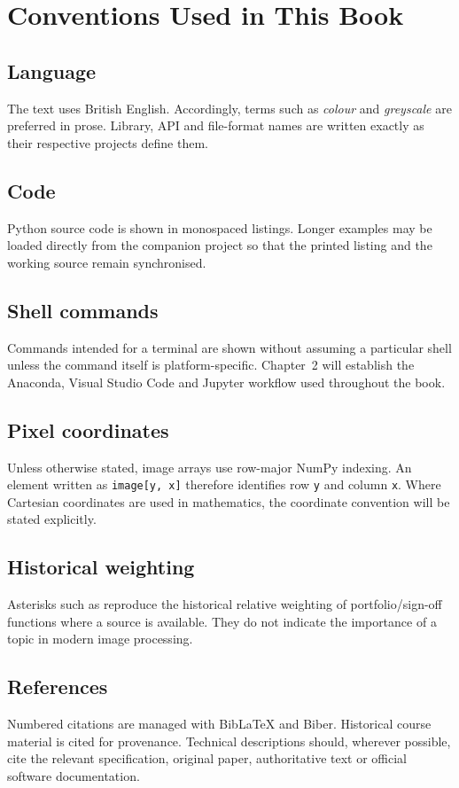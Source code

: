 \chapter*{Conventions Used in This Book}

\section*{Language}

The text uses British English. Accordingly, terms such as \emph{colour} and
\emph{greyscale} are preferred in prose. Library, API and file-format names are
written exactly as their respective projects define them.

\section*{Code}

Python source code is shown in monospaced listings. Longer examples may be
loaded directly from the companion project so that the printed listing and the
working source remain synchronised.

\section*{Shell commands}

Commands intended for a terminal are shown without assuming a particular shell
unless the command itself is platform-specific. Chapter~2 will establish the
Anaconda, Visual Studio Code and Jupyter workflow used throughout the book.

\section*{Pixel coordinates}

Unless otherwise stated, image arrays use row-major NumPy indexing. An element
written as \texttt{image[y, x]} therefore identifies row \texttt{y} and column
\texttt{x}. Where Cartesian coordinates are used in mathematics, the coordinate
convention will be stated explicitly.

\section*{Historical weighting}

Asterisks such as \historicalstars{****} reproduce the historical relative
weighting of portfolio/sign-off functions where a source is available. They do
not indicate the importance of a topic in modern image processing.

\section*{References}

Numbered citations are managed with BibLaTeX and Biber. Historical course
material is cited for provenance. Technical descriptions should, wherever
possible, cite the relevant specification, original paper, authoritative text
or official software documentation.
